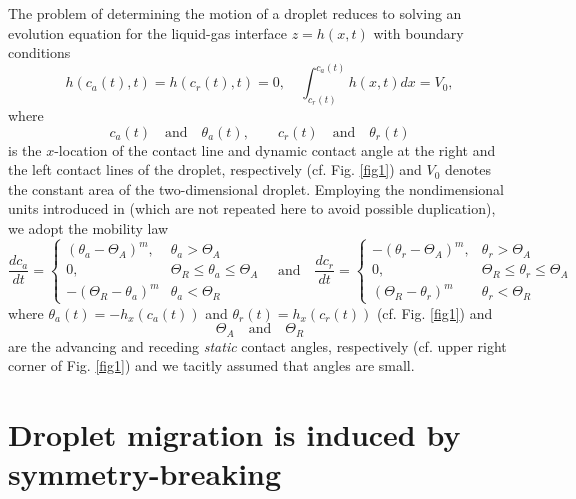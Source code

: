 \documentclass[%
 amsmath,amssymb,
 aps,
10.5pt]{revtex4-2}
\newcommand{\be}{\begin{equation}}
\newcommand{\ee}{\end{equation}}
\begin{document}
The problem of determining the motion of a droplet reduces to 
solving an evolution equation for the liquid-gas interface $z=h(x,t)$ with boundary conditions
\be \label{bcmob0}
h(c_a(t),t) = h(c_r(t),t) =0, \quad \int_{c_r(t)}^{c_a(t)} h(x,t)dx = V_0,
\ee
where 
\be \label{cathetaa}
c_a(t) \quad \textrm{and}\quad \theta_a(t),\quad \quad c_r(t) \quad \textrm{and}\quad \theta_r(t)
\ee
is the $x$-location of the contact line and dynamic contact angle at the right and the left contact lines
of the droplet, respectively (cf. Fig. \ref{fig1}) {and $V_0$ denotes the constant area of the two-dimensional
droplet}. 
Employing the nondimensional units introduced in \cite{Smith1995, Aggarwal2023} (which are not 
repeated here to avoid possible duplication), we adopt the mobility law 
\be \label{mob0}
\frac{dc_a}{dt} = \left\{ 
\begin{array}{cc}
(\theta_a-\Theta_A)^m, &  \theta_a>\Theta_A\\
0, & \Theta_R\leq \theta_a\leq \Theta_A\\
-(\Theta_R - \theta_a)^m& \theta_a<\Theta_R
\end{array} \right.
\quad
\textrm{and}
\quad
\frac{dc_r}{dt} = \left\{ 
\begin{array}{cc}
-(\theta_r-\Theta_A)^m, &  \theta_r>\Theta_A\\
0, & \Theta_R\leq \theta_r\leq \Theta_A\\
(\Theta_R - \theta_r)^m& \theta_r<\Theta_R
\end{array} \right.
\ee
where $\theta_a(t) = -h_x(c_a(t))$ and $\theta_r(t) = h_x(c_r(t))$ (cf. Fig. \ref{fig1})
and 
\be  \label{barthetaa}
\Theta_A\quad \textrm{and}\quad \Theta_R
\ee
are the advancing and receding \emph{static} contact angles, respectively (cf. upper right corner
of Fig. \ref{fig1}) { and we tacitly assumed that angles are small}. 













\section{\label{sec: symmetry}Droplet migration is induced by symmetry-breaking}
\end{document}
